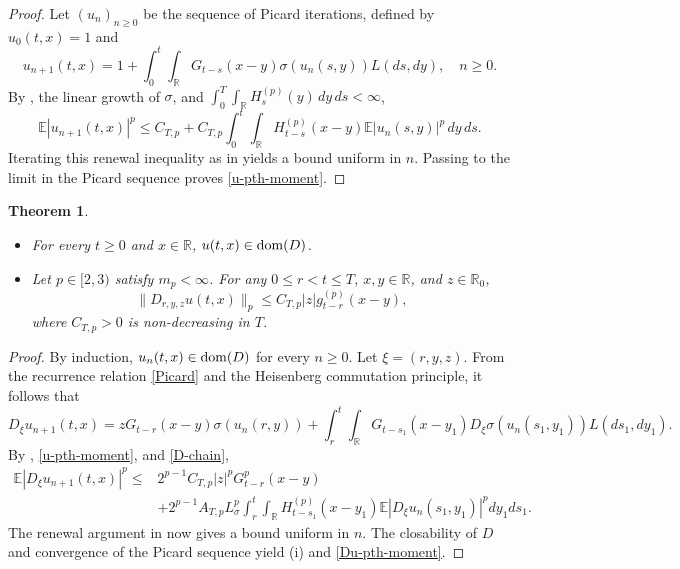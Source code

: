 \documentclass[12pt]{article}
\newtheorem{theorem}{Theorem}[section]
\def\bE{\mathbb{E}}
\def\bR{\mathbb{R}}
\begin{document}
\begin{proof}
Let $(u_n)_{n\geq 0}$ be the sequence of Picard iterations, defined by
$u_0(t,x)=1$ and
\begin{equation}
\label{Picard}
u_{n+1}(t,x)=1+\int_0^t \int_{\bR} G_{t-s}(x-y) \sigma (u_n(s,y)) L(ds,dy),
\quad n\geq 0.
\end{equation}
By \cite[Lemma~2.5]{BLW26}, the linear growth of $\sigma$, and
$\int_0^T\int_{\bR}H_s^{(p)}(y)\,dy\,ds<\infty$,
\[
\bE|u_{n+1}(t,x)|^p
\le
C_{T,p}
+C_{T,p}
\int_0^t\int_{\bR}
H_{t-s}^{(p)}(x-y)\bE|u_n(s,y)|^p\,dy\,ds .
\]
Iterating this renewal inequality as in \cite[Theorem~2.7]{BLW26}
yields a bound uniform in $n$. Passing to the limit in the Picard sequence
proves \eqref{u-pth-moment}.
\end{proof}


\begin{theorem}
\label{key-th-Du}
\begin{itemize}
\item[(i)] For every $t\geq0$ and $x\in\bR$, $u(t,x)\in{\rm dom}(D)$.
\item[(ii)] Let $p\in[2,3)$ satisfy $m_p<\infty$. For any
$0\le r<t\le T$, $x,y\in\bR$, and $z\in\bR_0$,
\begin{equation}
\label{Du-pth-moment}
 \| D_{r,y,z}u(t,x)\|_p\le C_{T,p}|z|g_{t-r}^{(p)}(x-y),
\end{equation}
where $C_{T,p}>0$ is non-decreasing in $T$.
\end{itemize}
\end{theorem}

\begin{proof}
By induction, $u_n(t,x)\in{\rm dom}(D)$ for every $n\ge0$.
Let $\xi=(r,y,z)$. From the recurrence relation \eqref{Picard} and the Heisenberg commutation principle, it follows that
\begin{equation*}
D_\xi u_{n+1}(t,x)=  zG_{t-r}(x-y)\sigma(u_n(r,y)) + \int_r^t\int_{\bR}
G_{t-s_1}(x-y_1)D_\xi\sigma(u_n(s_1,y_1))L(ds_1,dy_1).
\end{equation*}
 By \cite[Lemma~2.5]{BLW26}, \eqref{u-pth-moment}, and
\eqref{D-chain},
\begin{align*}
 \bE\left|D_{\xi}u_{n+1}(t,x)\right|^p \le &  2^{p-1}C_{T,p}|z|^pG_{t-r}^p(x-y)\\
 &+2^{p-1}A_{T,p}L_\sigma^p
\int_r^t\int_{\bR}
H_{t-s_1}^{(p)}(x-y_1)
\bE\left|D_{\xi}u_n(s_1,y_1)\right|^p
dy_1ds_1.
\end{align*}
The renewal argument in \cite[Theorem~3.1]{BLW26} now gives a bound
uniform in $n$. The closability of $D$ and convergence of the Picard sequence
yield (i) and \eqref{Du-pth-moment}.
\end{proof}
\end{document}
